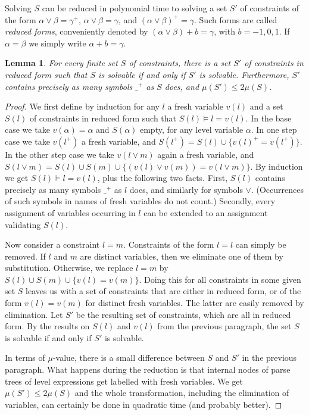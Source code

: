 \documentclass[11pt,a4paper]{article}
\newtheorem{lemma}{Lemma}[theorem]
\newcommand{\set}[1]{\{#1\}}
\begin{document}
Solving $S$ can be reduced in polynomial time to solving a set $S'$ of
constraints of the form $\alpha\vee\beta = \gamma^+$, $\alpha\vee\beta = \gamma$,
and $(\alpha\vee\beta)^+ = \gamma$. Such forms are called \emph{reduced forms},
conveniently denoted by $(\alpha\vee\beta)+b = \gamma$, with $b=-1,0,1$.
If $\alpha=\beta$ we simply write $\alpha+b = \gamma$.

\begin{lemma}\label{lem:reduced-form}
For every finite set $S$ of constraints, there is a set $S'$ of
constraints in reduced form such that $S$ is solvable if and only if $S'$
is solvable. Furthermore, $S'$ contains precisely as many symbols $\_^+$ as $S$ does,
and $\mu(S')\leq 2\mu(S)$.
\end{lemma}

\begin{proof}
We first define by induction for any $l$ a fresh variable $v(l)$ and
a set $S(l)$ of constraints in reduced form such that $S(l)\models l = v(l)$.
In the base case we take $v(\alpha)=\alpha$ and $S(\alpha)$ empty, for any
level variable $\alpha$. In one step case we take $v(l^+)$ a fresh variable,
and $S(l^+) = S(l) \cup \set{v(l)^+ =v(l^+)}$.
In the other step case we take $v(l\vee m)$ again a fresh variable,
and $S(l\vee m) = S(l) \cup S(m) \cup \set{(v(l)\vee v(m)) =v(l\vee m)}$.
By induction we get $S(l)\models l = v(l)$, plus the following two facts.
First, $S(l)$ contains precisely as many symbols $\_^+$ as $l$ does,
and similarly for symbols $\vee$.
(Occurrences of such symbols in names of fresh variables do not count.)
Secondly, every assignment of variables occurring in $l$ can be extended to an
assignment validating $S(l)$.

Now consider a constraint $l=m$. Constraints of the form $l=l$ can
simply be removed. If $l$ and $m$ are distinct variables,
then we eliminate one of them by substitution. Otherwise,
we replace $l=m$ by $S(l)\cup S(m)\cup \set{v(l)=v(m)}$.
Doing this for all constraints in some given set $S$
leaves us with a set of constraints that are either in
reduced form, or of the form $v(l)=v(m)$ for distinct fresh variables.
The latter are easily removed by elimination. Let $S'$ be the resulting set
of constraints, which are all in reduced form. By the results on $S(l)$
and $v(l)$ from the previous paragraph, the set $S$ is solvable if
and only if $S'$ is solvable.

In terms of $\mu$-value, there is a small
difference between $S$ and $S'$ in the previous paragraph.
What happens during the reduction is that internal nodes
of parse trees of level expressions get labelled with fresh variables.
We get $\mu(S')\leq 2\mu(S)$ and the whole transformation, including the
elimination of variables, can certainly be done in quadratic time
(and probably better).
\end{proof}
\end{document}
